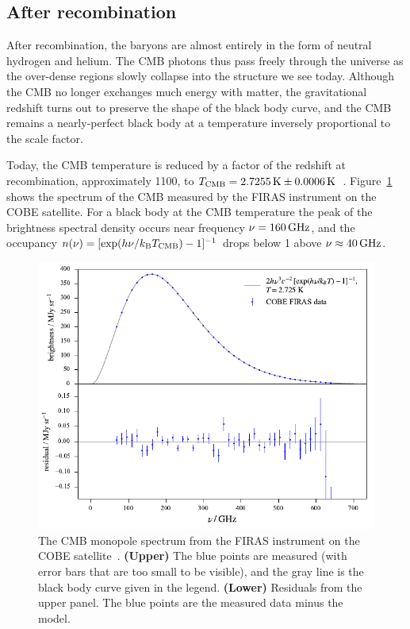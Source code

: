 \subsection{After recombination}
\label{sec:cmb.physics.after}

After recombination, the baryons are almost entirely in the form of neutral hydrogen and helium.
The CMB photons thus pass freely through the universe as the over-dense regions slowly collapse into the structure we see today.
Although the CMB no longer exchanges much energy with matter, the gravitational redshift turns out to preserve the shape of the black body curve, and the CMB remains a nearly-perfect black body at a temperature inversely proportional to the scale factor.

Today, the CMB temperature is reduced by a factor of the redshift at recombination, approximately 1100, to $T_\mathrm{CMB} = \SI{2.7255}{K} \pm \SI{0.0006}{K}$~\autocite{Fixsen2009ApJ}.
Figure~\ref{fig:firas_monopole_spectrum} shows the spectrum of the CMB measured by the FIRAS instrument on the COBE satellite.
For a black body at the CMB temperature the peak of the brightness spectral density occurs near frequency $\nu = \SI{160}{GHz}$, and the occupancy
$n(\nu) = [\exp(h \nu / k_\mathrm{B} T_\mathrm{CMB}) - 1]^{-1}$ drops below 1 above $\nu \approx \SI{40}{GHz}$.

\begin{figure}[tb]
\centering
\includegraphics[width=\textwidth]{cmb/firas_monopole_spectrum.pdf}
\caption[The CMB monopole spectrum from FIRAS on COBE.]
{
The CMB monopole spectrum from the FIRAS instrument on the COBE satellite~\autocite{Fixsen1996ApJ, Fixsen2002ApJ}.
\textbf{(Upper)} The blue points are measured (with error bars that are too small to be visible), and the gray line is the black body curve given in the legend.
\textbf{(Lower)} Residuals from the upper panel.
The blue points are the measured data minus the model.
}
\label{fig:firas_monopole_spectrum}
\end{figure}

